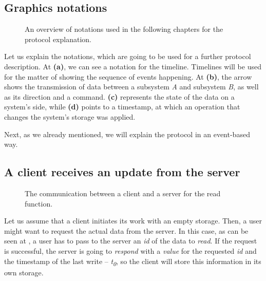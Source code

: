 \subsection*{Graphics notations}

\begin{figure}[!htb]
    \centering
    \def\svgwidth{0.35\linewidth}
    \subfloat[]{{}}%
    \qquad
    \def\svgwidth{0.35\linewidth}
    \subfloat[]{{}}%
 \def\svgwidth{0.35\linewidth}
    \subfloat[]{{}}%
    \qquad
 \def\svgwidth{0.35\linewidth}
    \subfloat[]{{}}%
    \qquad
    \caption{An overview of notations used in the following chapters for the protocol explanation.}%
    \label{fig:notations}%
\end{figure}

Let us explain the notations, which are going to be used for a further protocol description. At  \textbf{(a)}, we can see a notation for the timeline. Timelines will be used for the matter of showing the sequence of events happening. At  \textbf{(b)}, the arrow shows the transmission of data between a subsystem \textit{A} and subsystem \textit{B}, as well as its direction and a command.  \textbf{(c)} represents the state of the data on a system's side, while  \textbf{(d)} points to a timestamp, at which an operation that changes the system's storage was applied.

Next, as we already mentioned, we will explain the protocol in an event-based way. 

\subsection*{A client receives an update from the server}

\begin{figure}[!htb]
    \begin{center}
    \def\svgwidth{\linewidth}
    
    \caption {The communication between a client and a server for the read function.}
    \label{fig:design2}
\end{center}
\end{figure}

Let us assume that a client initiates its work with an empty storage. Then, a user might want to request the actual data from the server. In this case, as can be seen at , a user has to pass to the server an \textit{id} of the data to \textit{read}. If the request is successful, the server is going to \textit{respond} with a \textit{value} for the requested \textit{id} and the timestamp of the last write -- \textit{t\textsubscript{0}}, so the client will store this information in its own storage.

